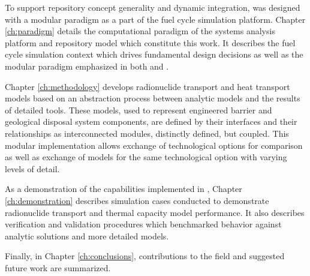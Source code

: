 To support repository concept generality and dynamic integration, \Cyder was 
designed with a modular paradigm as a part of the \Cyclus fuel cycle simulation 
platform. Chapter \ref{ch:paradigm} details the computational paradigm of the 
\Cyclus systems analysis platform and \Cyder repository model which constitute 
this work.  It describes the \Cyclus fuel cycle simulation context which drives 
fundamental \Cyder design decisions as well as the modular paradigm emphasized 
in both \Cyclus and \Cyder. 

Chapter \ref{ch:methodology} develops  radionuclide transport and heat transport 
models based on an abstraction process between analytic models and the results 
of detailed tools.  These models, used to represent engineered barrier and geological 
disposal system components, are defined by their interfaces and their 
relationships as interconnected modules, distinctly defined, but coupled.  This 
modular implementation allows exchange  of technological options for comparison 
as well as exchange of models for the same technological option with varying 
levels of detail.  

As a demonstration of the capabilities implemented in \Cyder, Chapter 
\ref{ch:demonstration} describes simulation cases conducted to demonstrate 
radionuclide transport and thermal capacity model performance. It also describes 
verification and validation procedures which benchmarked \Cyder behavior against 
analytic solutions and more detailed models.  

Finally, in Chapter \ref{ch:conclusions}, contributions to the field and 
suggested future work are summarized. 




